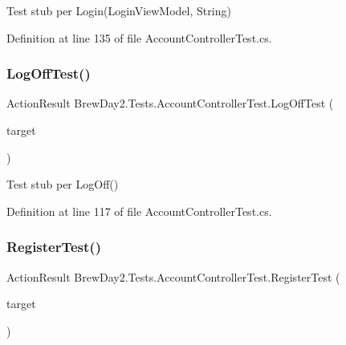 Test stub per Login(\+Login\+View\+Model, String)



Definition at line 135 of file Account\+Controller\+Test.\+cs.

\mbox{\label{class_brew_day2_1_1_tests_1_1_account_controller_test_a6e662e28d87176f7ba2fb82b568d3b17}} 
\subsubsection{\texorpdfstring{Log\+Off\+Test()}{LogOffTest()}}
{\footnotesize\ttfamily Action\+Result Brew\+Day2.\+Tests.\+Account\+Controller\+Test.\+Log\+Off\+Test (\begin{DoxyParamCaption}\item[{\mbox{[}\+Pex\+Assume\+Under\+Test\mbox{]} \mbox{\hyperlink{class_brew_day2_1_1_controllers_1_1_account_controller}{Account\+Controller}}}]{target }\end{DoxyParamCaption})}



Test stub per Log\+Off()



Definition at line 117 of file Account\+Controller\+Test.\+cs.

\mbox{\label{class_brew_day2_1_1_tests_1_1_account_controller_test_a7760e5a69e40b3c62b41639a8843e188}} 
\subsubsection{\texorpdfstring{Register\+Test()}{RegisterTest()}}
{\footnotesize\ttfamily Action\+Result Brew\+Day2.\+Tests.\+Account\+Controller\+Test.\+Register\+Test (\begin{DoxyParamCaption}\item[{\mbox{[}\+Pex\+Assume\+Under\+Test\mbox{]} \mbox{\hyperlink{class_brew_day2_1_1_controllers_1_1_account_controller}{Account\+Controller}}}]{target }\end{DoxyParamCaption})}



